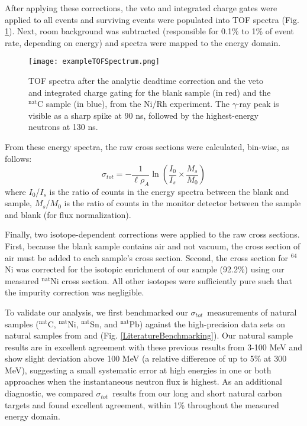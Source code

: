 \documentclass[twocolumn,secnumarabic,amssymb, nobibnotes, aps, prl,
superscriptaddress, nobalancelastpage, floatfix]{revtex4}
\newcommand{\tot}{\ensuremath{\sigma_{tot}}}
\begin{document}
After applying these corrections, the veto and integrated charge gates were applied to 
all events and surviving events were populated into TOF spectra (Fig.
\ref{ExampleTOFSpectrum}). Next, room background was subtracted (responsible for 0.1\% to 
1\% of event rate, depending on energy) and spectra were mapped to the energy domain.
\begin{figure}
    \texttt{[image: exampleTOFSpectrum.png]}
    \caption{TOF spectra after the analytic deadtime correction and
        the veto and integrated charge gating for the blank sample (in
        red) and the $^{\text{nat}}$C sample (in blue), from the Ni/Rh experiment.
        The $\gamma$-ray peak is visible as a sharp spike at 90 ns, followed by
        the highest-energy neutrons at 130 ns.}
    \label{ExampleTOFSpectrum}
\end{figure}

From these energy spectra, the raw cross sections were calculated, bin-wise, as follows:
\begin{equation}\label{RawTCSEquation}
    \tot = -\frac{1}{\ell\rho_{A}}
    \ln \left(\frac{I_{0}}{I_{s}}\times\frac{M_{s}}{M_{0}}\right)
\end{equation}
where $I_{0}$/$I_{s}$ is the ratio of counts in the energy spectra between 
the blank and sample, $M_{s}$/$M_{0}$ is the ratio of counts in the
monitor detector between the sample and blank (for flux normalization).

Finally, two isotope-dependent corrections were applied to the raw cross
sections. First, because the blank sample contains air and not vacuum,
the cross section of air must be added to each sample's cross section.
Second, the cross section for $^{64}$Ni was corrected for the isotopic enrichment of our
sample (92.2\%) using our measured $^{\text{nat}}$Ni cross section. All other isotopes were 
sufficiently pure such that the impurity correction was negligible.

To validate our analysis, we first benchmarked our \tot\ measurements of natural samples
($^{\text{nat}}$C, $^{\text{nat}}$Ni, $^{\text{nat}}$Sn, and
$^{\text{nat}}$Pb) against the high-precision data sets on natural samples from
\cite{Finlay1993} and \cite{Abfalterer2001} (Fig.
\ref{LiteratureBenchmarking}). Our natural sample results
are in excellent agreement with 
these previous results from 3-100 MeV and show slight deviation above 100 MeV (a
relative difference of up to 5\% at 300 MeV), suggesting a small systematic
error at high energies in one or both approaches when the instantaneous neutron
flux is highest. As an additional diagnostic, we compared 
\tot\ results from our long and short natural carbon targets and
found excellent agreement, within 1\% throughout the measured energy domain.
\end{document}
